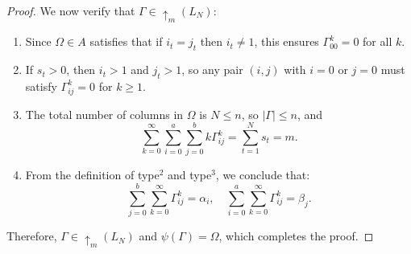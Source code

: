 \documentclass[10pt,a4paper]{amsart}
\begin{document}
\begin{proof}
    We now verify that $\Gamma \in \uparrow_{m}(L_N)$:
    \begin{enumerate}
        \item Since $\Omega \in A$ satisfies that if $i_t = j_t$ then $i_t \neq 1$, this ensures $\Gamma_{00}^k = 0$ for all $k$.
        \item If $s_t > 0$, then $i_t > 1$ and $j_t > 1$, so any pair $(i,j)$ with $i = 0$ or $j = 0$ must satisfy $\Gamma_{ij}^k = 0$ for $k \geq 1$.
        \item The total number of columns in $\Omega$ is $N \leq n$, so $|\Gamma| \leq n$, and        $$
        \sum_{k=0}^{\infty} \sum_{i=0}^a \sum_{j=0}^b k \Gamma_{ij}^k = \sum_{t=1}^{N} s_t = m.
        $$
        \item From the definition of type$^2$ and type$^3$, we conclude that:
        $$
        \sum_{j=0}^{b} \sum_{k=0}^{\infty} \Gamma_{ij}^k = \alpha_i, \quad
        \sum_{i=0}^{a} \sum_{k=0}^{\infty} \Gamma_{ij}^k = \beta_j.
        $$
    \end{enumerate}
 Therefore, $\Gamma \in \uparrow_{m}(L_N)$ and $\psi(\Gamma) = \Omega$, which completes the proof.
\end{proof}
\end{document}
